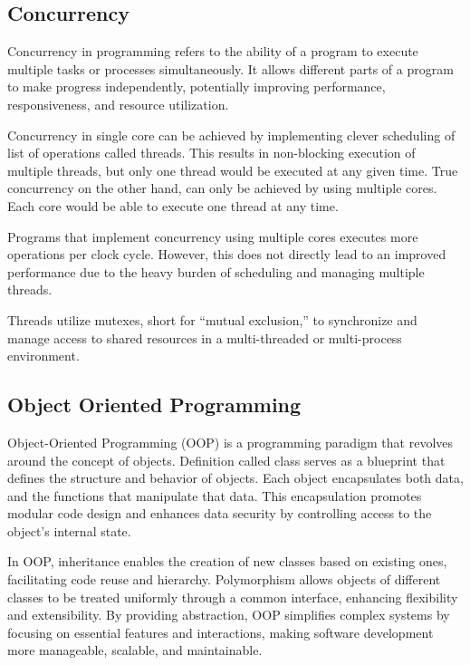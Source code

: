 \documentclass[a4paper,oneside,12pt]{report}
\numberwithin{equation}{chapter}
\begin{document}
\subsection{Concurrency}

Concurrency in programming refers to the ability of a program to execute multiple tasks or processes simultaneously. It allows different parts of a program to make progress independently, potentially improving performance, responsiveness, and resource utilization.

Concurrency in single core can be achieved by implementing clever scheduling of list of operations called threads. This results in non-blocking execution of multiple threads, but only one thread would be executed at any given time. 
True concurrency on the other hand, can only be achieved by using multiple cores. Each core would be able to execute one thread at any time.

Programs that implement concurrency using multiple cores executes more operations per clock cycle. 
However, this does not directly lead to an improved performance due to the heavy burden of scheduling and managing multiple threads.

Threads utilize mutexes, short for ``mutual exclusion,''
to synchronize and manage access to shared resources 
in a multi-threaded or multi-process environment. 

\subsection{Object Oriented Programming}

Object-Oriented Programming (OOP) is a programming paradigm that revolves around the concept of objects. 
Definition called class serves as a blueprint that defines the structure and behavior of objects. 
Each object encapsulates both data, and the functions that manipulate that data. 
This encapsulation promotes modular code design and enhances data security by controlling access to the object's internal state. 

In OOP, inheritance enables the creation of new classes based on existing ones, facilitating code reuse and hierarchy. 
Polymorphism allows objects of different classes to be treated uniformly through a common interface, enhancing flexibility and extensibility. 
By providing abstraction, OOP simplifies complex systems by focusing on essential features and interactions, making software development more manageable, scalable, and maintainable.
\end{document}
